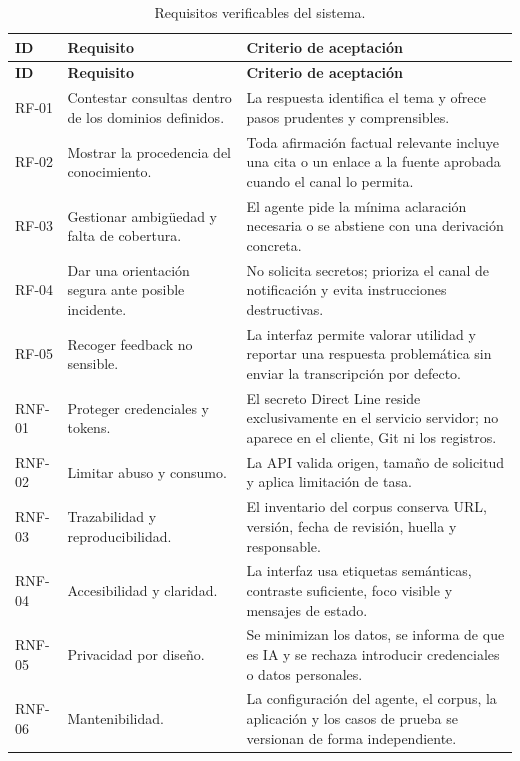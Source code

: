 \begin{longtable}{p{}p{}p{}}
\caption{Requisitos verificables del sistema.}\label{tab:requisitos}\\
\toprule
\textbf{ID} & \textbf{Requisito} & \textbf{Criterio de aceptaci\'on}\\
\midrule
\endfirsthead
\toprule
\textbf{ID} & \textbf{Requisito} & \textbf{Criterio de aceptaci\'on}\\
\midrule
\endhead
RF-01 & Contestar consultas dentro de los dominios definidos. & La respuesta identifica el tema y ofrece pasos prudentes y comprensibles.\\
RF-02 & Mostrar la procedencia del conocimiento. & Toda afirmaci\'on factual relevante incluye una cita o un enlace a la fuente aprobada cuando el canal lo permita.\\
RF-03 & Gestionar ambig\"uedad y falta de cobertura. & El agente pide la m\'inima aclaraci\'on necesaria o se abstiene con una derivaci\'on concreta.\\
RF-04 & Dar una orientaci\'on segura ante posible incidente. & No solicita secretos; prioriza el canal de notificaci\'on y evita instrucciones destructivas.\\
RF-05 & Recoger feedback no sensible. & La interfaz permite valorar utilidad y reportar una respuesta problem\'atica sin enviar la transcripci\'on por defecto.\\
RNF-01 & Proteger credenciales y tokens. & El secreto Direct Line reside exclusivamente en el servicio servidor; no aparece en el cliente, Git ni los registros.\\
RNF-02 & Limitar abuso y consumo. & La API valida origen, tama\~no de solicitud y aplica limitaci\'on de tasa.\\
RNF-03 & Trazabilidad y reproducibilidad. & El inventario del corpus conserva URL, versi\'on, fecha de revisi\'on, huella y responsable.\\
RNF-04 & Accesibilidad y claridad. & La interfaz usa etiquetas sem\'anticas, contraste suficiente, foco visible y mensajes de estado.\\
RNF-05 & Privacidad por dise\~no. & Se minimizan los datos, se informa de que es IA y se rechaza introducir credenciales o datos personales.\\
RNF-06 & Mantenibilidad. & La configuraci\'on del agente, el corpus, la aplicaci\'on y los casos de prueba se versionan de forma independiente.\\
\bottomrule
\end{longtable}

